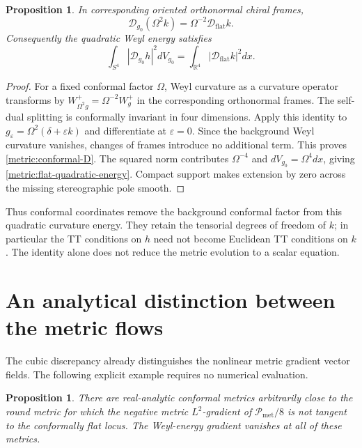 \documentclass[11pt]{article}
\numberwithin{equation}{section}
\newtheorem{proposition}[theorem]{Proposition}
\theoremstyle{definition}
\theoremstyle{remark}
\begin{document}
\begin{proposition}\label{prop:metric-conformal-covariance}
In corresponding oriented orthonormal chiral frames,
\begin{equation}\label{metric:conformal-D}
 \mathcal D_{g_0}(\Omega^2k)=\Omega^{-2}\mathcal D_{\mathrm{flat}}k.
\end{equation}
Consequently the quadratic Weyl energy satisfies
\begin{equation}\label{metric:flat-quadratic-energy}
 \int_{S^4}|\mathcal D_{g_0}h|^2dV_{g_0}
 =\int_{\mathbb R^4}|\mathcal D_{\mathrm{flat}}k|^2dx.
\end{equation}
\end{proposition}

\begin{proof}
For a fixed conformal factor $\Omega$, Weyl curvature as a curvature
operator transforms by
$W^+_{\Omega^2g}=\Omega^{-2}W^+_g$ in the corresponding orthonormal
frames. The self-dual splitting is conformally invariant in four
dimensions. Apply this identity to
$g_\varepsilon=\Omega^2(\delta+\varepsilon k)$ and differentiate at
$\varepsilon=0$. Since the background Weyl curvature vanishes, changes
of frames introduce no additional term. This proves
\eqref{metric:conformal-D}. The squared norm contributes
$\Omega^{-4}$ and $dV_{g_0}=\Omega^4dx$, giving
\eqref{metric:flat-quadratic-energy}. Compact support makes extension
by zero across the missing stereographic pole smooth.
\end{proof}

Thus conformal coordinates remove the background conformal factor from
this quadratic curvature energy. They retain the tensorial degrees of
freedom of $k$; in particular the TT conditions on $h$ need not become
Euclidean TT conditions on $k$. The identity alone does not reduce the
metric evolution to a scalar equation.

\section{An analytical distinction between the metric flows}
\label{subsec:metric-conformal-test}

The cubic discrepancy already distinguishes the nonlinear metric
gradient vector fields. The following explicit example requires no
numerical evaluation.

\begin{proposition}\label{prop:metric-nonpreservation}
There are real-analytic conformal metrics arbitrarily close to the round
metric for which the negative metric $L^2$-gradient of
$\mathcal P_{\mathrm{met}}/8$ is not tangent to the conformally flat
locus. The Weyl-energy gradient vanishes at all of these metrics.
\end{proposition}
\end{document}
